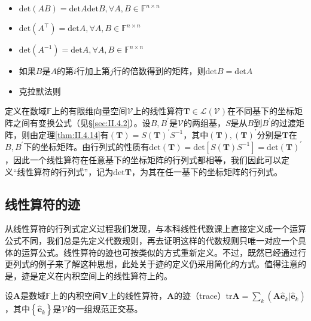 \documentclass[main.tex]{subfiles}
\begin{document}
\begin{theorem}
\quad
\begin{itemize}
    \item $\mathrm{det}\left(AB\right)=\mathrm{det}A\mathrm{det}B,\forall A,B\in\mathbb{F}^{n\times n}$
    \item $\mathrm{det}\left(A^\intercal\right)=\mathrm{det}A,\forall A,B\in\mathbb{F}^{n\times n}$
    \item $\mathrm{det}\left(A^{-1}\right)=\mathrm{det}A,\forall A,B\in\mathbb{F}^{n\times n}$
    \item 如果$B$是$A$的第$i$行加上第$j$行的倍数得到的矩阵，则$\mathrm{det}B=\mathrm{det}A$
    \item 克拉默法则\cite[\S1.5,p.~15]{周胜林2012线性代数}
\end{itemize}
\end{theorem}

定义在数域$\mathbb{F}$上的有限维向量空间$\mathcal{V}$上的线性算符$\mathbf{T}\in\mathcal{L}\left(\mathcal{V}\right)$在不同基下的坐标矩阵之间有变换公式（见\S\ref{sec:II.4.2}）。设$B,B^\prime$是$\mathcal{V}$的两组基，$S$是从$B$到$B^\prime$的过渡矩阵，则由定理\ref{thm:II.4.14}有$\left(\mathbf{T}\right)=S\left(\mathbf{T}\right)^\prime S^{-1}$，其中$\left(\mathbf{T}\right),\left(\mathbf{T}\right)^\prime$分别是$\mathbf{T}$在$B,B^\prime$下的坐标矩阵。由行列式的性质有$\mathrm{det}\left(\mathbf{T}\right)=\mathrm{det}\left[S\left(\mathbf{T}\right)S^{-1}\right]=\mathrm{det}\left(\mathbf{T}\right)^\prime$，因此一个线性算符在任意基下的坐标矩阵的行列式都相等，我们因此可以定义“线性算符的行列式”，记为$\mathrm{det}\mathbf{T}$，为其在任一基下的坐标矩阵的行列式。

\subsection{线性算符的迹}
从线性算符的行列式定义过程我们发现，与本科线性代数课上直接定义成一个运算公式不同，我们总是先定义代数规则，再去证明这样的代数规则只唯一对应一个具体的运算公式。线性算符的迹也可按类似的方式重新定义。不过，既然已经通过行更列式的例子来了解这种思想，此处关于迹的定义仍采用简化的方式。值得注意的是，迹是定义在内积空间上的线性算符上的。

\begin{definition}[线性算符的迹]
设$\mathbf{A}$是数域$\mathbb{F}$上的内积空间$\mathbf{V}$上的线性算符，$\mathbf{A}$的迹（trace）$\mathrm{tr}\mathbf{A}=\sum_k\left(\mathbf{A}\mathbf{\hat{e}}_k|\mathbf{\hat{e}}_k\right)$，其中$\left\{\mathbf{\hat{e}}_k\right\}$是$\mathcal{V}$的一组规范正交基。
\end{definition}
\end{document}
